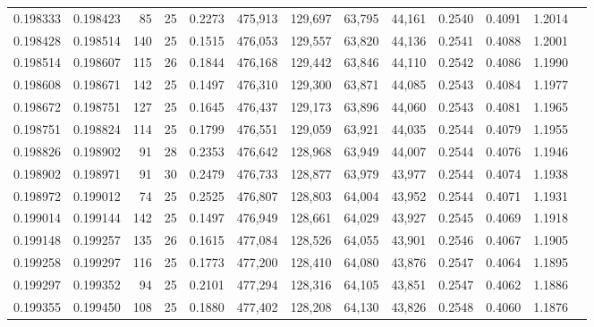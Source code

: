 \begin{tabular}{rrrrrrrrrrrrr}
0.198333 & 0.198423 &  85 &  25 &                                     0.2273 & 475,913 & 129,697 &  63,795 &  44,161 & 0.2540 & 0.4091 & 1.2014 \\
0.198428 & 0.198514 & 140 &  25 &                                     0.1515 & 476,053 & 129,557 &  63,820 &  44,136 & 0.2541 & 0.4088 & 1.2001 \\
0.198514 & 0.198607 & 115 &  26 &                                     0.1844 & 476,168 & 129,442 &  63,846 &  44,110 & 0.2542 & 0.4086 & 1.1990 \\
0.198608 & 0.198671 & 142 &  25 &                                     0.1497 & 476,310 & 129,300 &  63,871 &  44,085 & 0.2543 & 0.4084 & 1.1977 \\
0.198672 & 0.198751 & 127 &  25 &                                     0.1645 & 476,437 & 129,173 &  63,896 &  44,060 & 0.2543 & 0.4081 & 1.1965 \\
0.198751 & 0.198824 & 114 &  25 &                                     0.1799 & 476,551 & 129,059 &  63,921 &  44,035 & 0.2544 & 0.4079 & 1.1955 \\
0.198826 & 0.198902 &  91 &  28 &                                     0.2353 & 476,642 & 128,968 &  63,949 &  44,007 & 0.2544 & 0.4076 & 1.1946 \\
0.198902 & 0.198971 &  91 &  30 &                                     0.2479 & 476,733 & 128,877 &  63,979 &  43,977 & 0.2544 & 0.4074 & 1.1938 \\
0.198972 & 0.199012 &  74 &  25 &                                     0.2525 & 476,807 & 128,803 &  64,004 &  43,952 & 0.2544 & 0.4071 & 1.1931 \\
0.199014 & 0.199144 & 142 &  25 &                                     0.1497 & 476,949 & 128,661 &  64,029 &  43,927 & 0.2545 & 0.4069 & 1.1918 \\
0.199148 & 0.199257 & 135 &  26 &                                     0.1615 & 477,084 & 128,526 &  64,055 &  43,901 & 0.2546 & 0.4067 & 1.1905 \\
0.199258 & 0.199297 & 116 &  25 &                                     0.1773 & 477,200 & 128,410 &  64,080 &  43,876 & 0.2547 & 0.4064 & 1.1895 \\
0.199297 & 0.199352 &  94 &  25 &                                     0.2101 & 477,294 & 128,316 &  64,105 &  43,851 & 0.2547 & 0.4062 & 1.1886 \\
0.199355 & 0.199450 & 108 &  25 &                                     0.1880 & 477,402 & 128,208 &  64,130 &  43,826 & 0.2548 & 0.4060 & 1.1876 \\

\end{tabular}
